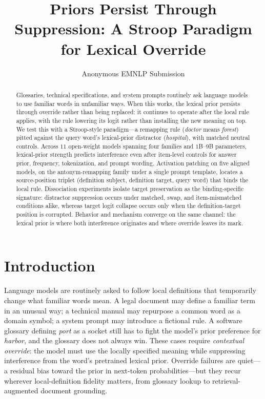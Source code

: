 \documentclass[11pt]{article}
\title{Priors Persist Through Suppression: A Stroop Paradigm for Lexical Override}
\author{Anonymous EMNLP Submission}
\begin{document}
\maketitle

\begin{abstract}
Glossaries, technical specifications, and system prompts routinely ask language models to use
familiar words in unfamiliar ways. When this works, the lexical prior persists through
override rather than being replaced: it continues to operate after the local rule applies,
with the rule lowering its logit rather than installing the new meaning on top. We test this
with a Stroop-style paradigm---a remapping rule (\textit{doctor} means \textit{forest}) pitted
against the query word's lexical-prior distractor (\textit{hospital}), with matched neutral
controls. Across $11$ open-weight models spanning four families and $1$B--$9$B parameters,
lexical-prior strength predicts interference even after item-level controls for answer prior,
frequency, tokenization, and prompt wording. Activation patching on five aligned models, on the
antonym-remapping family under a single prompt template, locates a source-position triplet
(definition subject, definition target, query word) that binds the local rule. Dissociation experiments isolate target preservation as the
binding-specific signature: distractor suppression occurs under matched, swap, and
item-mismatched conditions alike, whereas target logit collapse occurs only when the
definition-target position is corrupted. Behavior and mechanism converge on the same channel:
the lexical prior is where both interference originates and where override leaves its mark.
\end{abstract}


\section{Introduction}
\label{sec:intro}

Language models are routinely asked to follow local definitions that temporarily change
what familiar words mean. A legal document may define a familiar term in an unusual way; a
technical manual may repurpose a common word as a domain symbol; a system prompt may introduce
a fictional rule. A software glossary defining \emph{port} as a socket still has to fight the
model's prior preference for \emph{harbor}, and the glossary does not always win. These cases require \emph{contextual override}: the model must use the
locally specified meaning while suppressing interference from the word's pretrained lexical
prior. Override failures are quiet---a residual bias toward the prior in next-token
probabilities---but they recur wherever local-definition fidelity matters, from glossary
lookup to retrieval-augmented document grounding.
\end{document}

